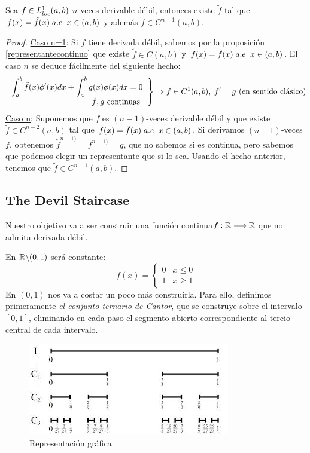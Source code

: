 \begin{prop}
Sea $f\in L^1_{loc}(a,b)$ $n$-veces derivable débil, entonces existe $\tilde{f}$ tal que $f(x)=\tilde{f}(x) \; a.e \;\; x\in(a,b)$ y además $\tilde{f}\in C^{n-1}(a,b)$.
\end{prop}

\begin{proof}
\underline{Caso n=1}: Si $f$ tiene derivada débil, sabemos por la proposición \ref{representantecontinuo} que existe $\tilde{f}\in C(a,b)$ y $f(x)=\tilde{f}(x) \;a.e \;\; x\in(a,b)$.
El caso $n$ se deduce fácilmente del siguiente hecho:
\[
\left.
\begin{array}{r}
\displaystyle\int_{ a }^{ b } \tilde{f}(x)\phi'(x)dx+\displaystyle\int_{ a }^{ b } g(x)\phi(x)dx=0 \\
\tilde{f}, g \text{ continuas }
\end{array}
\right\} \Rightarrow \tilde{f}\in C^1(a,b), \;\tilde{f}'=g \text{ (en sentido clásico)}
\]
\underline{Caso n}: Suponemos que $f$ es $(n-1)$-veces derivable débil y que existe $\tilde{f}\in C^{n-2}(a,b)$ tal que $f(x)=\tilde{f}(x)\;a.e \;\; x\in(a,b)$.
Si derivamos $(n-1)$-veces $f$, obtenemos $\tilde{f}^{n-1)}=f^{n-1)}=g$, que no sabemos si es continua, pero sabemos que podemos elegir un representante que si lo sea. Usando el hecho anterior, tenemos que $\tilde{f}\in C^{n-1}(a,b)$.
\end{proof}

\subsection{The Devil Staircase}

Nuestro objetivo va a ser construir una función continua$f : \mathbb{R} \longrightarrow \mathbb{R}$ que no admita derivada débil.

En $\mathbb{R}\backslash(0,1)$ será constante:
\[
f(x)=\left\{
\begin{array}{cc}
0 & x\leq 0\\
1 & x\geq 1
\end{array}
\right.
\]
En $(0,1)$ nos va a costar un poco más construirla. Para ello, definimos primeramente \textit{el conjunto ternario de Cantor}, que se construye sobre el intervalo $[0,1]$, eliminando en cada paso el segmento abierto correspondiente al tercio central de cada intervalo.

\begin{figure}[h]
   \center
  \includegraphics[scale=0.5]{img/cantor.jpeg}
  \caption{Representación gráfica}
\end{figure}

